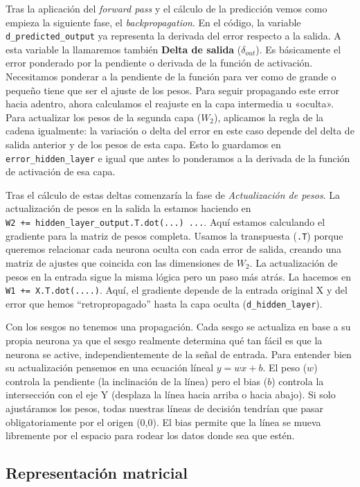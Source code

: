 \documentclass[a4paper,11pt]{article}
\begin{document}
Tras la aplicación del \emph{forward pass} y el cálculo de la predicción
vemos como empieza la siguiente fase, el \emph{backpropagation}. En el
código, la variable \texttt{d\_predicted\_output} ya representa la
derivada del error respecto a la salida. A esta variable la llamaremos
también \textbf{Delta de salida} (\(\delta_{out}\)). Es básicamente el
error ponderado por la pendiente o derivada de la función de activación.
Necesitamos ponderar a la pendiente de la función para ver como de
grande o pequeño tiene que ser el ajuste de los pesos. Para seguir
propagando este error hacia adentro, ahora calculamos el reajuste en la
capa intermedia u «oculta». Para actualizar los pesos de la segunda capa
(\(W_2\)), aplicamos la regla de la cadena igualmente: la variación o
delta del error en este caso depende del delta de salida anterior y de
los pesos de esta capa. Esto lo guardamos en
\texttt{error\_hidden\_layer} e igual que antes lo ponderamos a la
derivada de la función de activación de esa capa.

Tras el cálculo de estas deltas comenzaría la fase de
\emph{Actualización de pesos}. La actualización de pesos en la salida la
estamos haciendo en
\texttt{W2\ +=\ hidden\_layer\_output.T.dot(...)\ ...}. Aquí estamos
calculando el gradiente para la matriz de pesos completa. Usamos la
transpuesta (\texttt{.T}) porque queremos relacionar cada neurona oculta
con cada error de salida, creando una matriz de ajustes que coincida con
las dimensiones de \(W_2\). La actualización de pesos en la entrada
sigue la misma lógica pero un paso más atrás. La hacemos en
\texttt{W1\ +=\ X.T.dot(....)}. Aquí, el gradiente depende de la entrada
original X y del error que hemos ``retropropagado'' hasta la capa oculta
(\texttt{d\_hidden\_layer}).

Con los sesgos no tenemos una propagación. Cada sesgo se actualiza en
base a su propia neurona ya que el sesgo realmente determina qué tan
fácil es que la neurona se active, independientemente de la señal de
entrada. Para entender bien su actualización pensemos en una ecuación
líneal \(y = wx +b\). El peso (\(w\)) controla la pendiente (la
inclinación de la línea) pero el bias (\(b\)) controla la intersección
con el eje Y (desplaza la línea hacia arriba o hacia abajo). Si solo
ajustáramos los pesos, todas nuestras líneas de decisión tendrían que
pasar obligatoriamente por el origen (0,0). El bias permite que la línea
se mueva libremente por el espacio para rodear los datos donde sea que
estén.


\subsection{Representación matricial}
\end{document}
